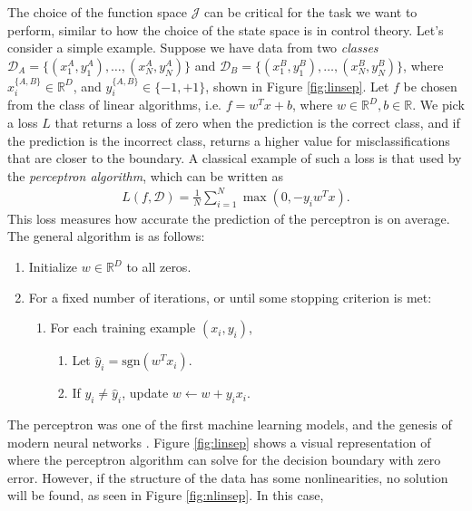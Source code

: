 \documentclass[letterpaper,12pt,peerreviewca,draftcls]{IEEEtran}
\newcommand{\R}{\mathbb{R}}
\newcommand{\weight}{w}
\newcommand{\sampSetClass}{\mathcal{D}}
\newcommand{\nsamp}{N}
\newcommand{\eqlabel}[1]{\label{eq:#1}}
\newcommand{\sgn}{\mathrm{sgn}}
\newcommand{\functionSet}{\mathcal{J}}
\begin{document}
The choice of the function space $\functionSet$ can be critical for the task we want to perform,
similar to how the choice of the state space is in control theory. Let's consider a simple
example. Suppose we have data from two \emph{classes} $\sampSetClass_A = \{(x_1^A, y_1^A), \dots, (x_N^A, y_N^A)\}$ and 
$\sampSetClass_B = \{(x_1^B, y_1^B), \dots, (x_N^B, y_N^B)\}$, where $x_i^{\{A,B\}}\in\R^D$, and $y_i^{\{A,B\}}\in\{-1,+1\}$, shown
in Figure \ref{fig:linsep}. Let $f$ be chosen from the class of linear algorithms, i.e. $f = w^Tx + b$, where $w\in\R^D, b\in\R$. 
We pick a loss $L$ that returns a loss of zero when the prediction is the correct class, and if the prediction is the incorrect class,
returns a higher value for misclassifications that are closer to the boundary. A classical example of such a loss is that used by
the \emph{perceptron algorithm}, which can be written as 
\begin{align}\eqlabel{perc_loss}
 L(f, \sampSetClass) = \frac{1}{\nsamp}\sum_{i=1}^N\max(0, -y_iw^Tx). 
\end{align}
This loss measures how accurate the prediction of the perceptron is on average. The general algorithm is as follows:
\begin{enumerate}
 \item Initialize $\weight\in\R^D$ to all zeros. 
 \item For a fixed number of iterations, or until some stopping criterion is met:
       \begin{enumerate}
        \item For each training example $(x_i, y_i)$,
              \begin{enumerate}
               \item Let $\hat{y}_i=\sgn(\weight^Tx_i)$.
               \item If $y_i\neq\hat{y}_i$, update $\weight \leftarrow \weight + y_ix_i$.
              \end{enumerate}
       \end{enumerate}
\end{enumerate}
The perceptron was one of the first machine learning models, and the genesis of modern neural networks \cite{rosenblatt1958perceptron}. 
Figure \ref{fig:linsep} shows a visual representation of where the perceptron algorithm can solve for the decision boundary with zero error. 
However, if the structure of the data has some nonlinearities, no solution will be found, as seen in Figure \ref{fig:nlinsep}. In this case,
\end{document}
